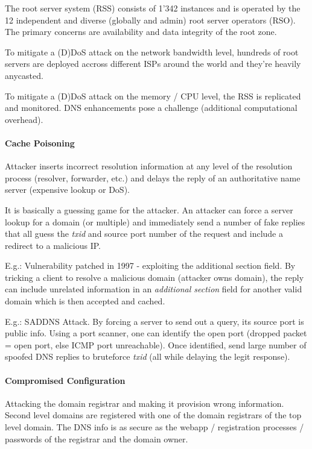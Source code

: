 The root server system (RSS) consists of 1'342 instances and is operated by the 12 independent and diverse (globally and admin) root server operators (RSO). The primary concerns are availability and data integrity of the root zone.

To mitigate a (D)DoS attack on the network bandwidth level, hundreds of root servers are deployed accross different ISPs around the world and they're heavily anycasted.

To mitigate a (D)DoS attack on the memory / CPU level, the RSS is replicated and monitored. DNS enhancements pose a challenge (additional computational overhead).

\paragraph{Cache Poisoning}
Attacker inserts incorrect resolution information at any level of the resolution process (resolver, forwarder, etc.) and delays the reply of an authoritative name server (expensive lookup or DoS). 

It is basically a guessing game for the attacker. An attacker can force a server lookup for a domain (or multiple) and immediately send a number of fake replies that all guess the \textit{txid} and source port number of the request and include a redirect to a malicious IP.

E.g.: Vulnerability patched in 1997 - exploiting the additional section field. By tricking a client to resolve a malicious domain (attacker owns domain), the reply can include unrelated information in an \textit{additional section} field for another valid domain which is then accepted and cached.

E.g.: SADDNS Attack. By forcing a server to send out a query, its source port is public info. Using a port scanner, one can identify the open port (dropped packet = open port, else ICMP port unreachable). Once identified, send large number of spoofed DNS replies to bruteforce \textit{txid} (all while delaying the legit response). %

\paragraph{Compromised Configuration}
Attacking the domain registrar and making it provision wrong information. Second level domains are registered with one of the domain registrars of the top level domain. The DNS info is as secure as the webapp / registration processes / passwords of the registrar and the domain owner.

